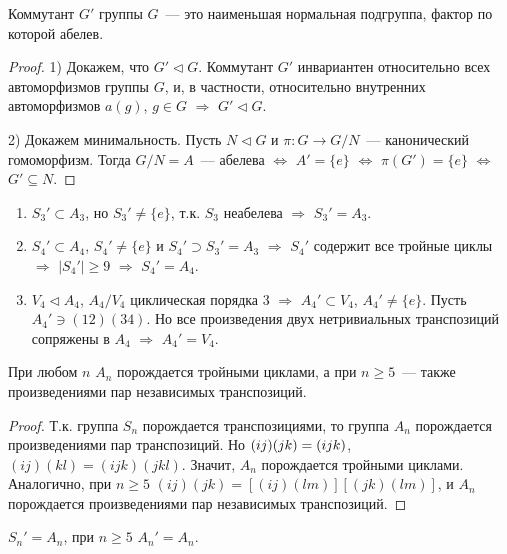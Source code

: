 \documentclass[a4paper]{article}
\newcommand*{\p}[1]{#1\nobreak\discretionary{}{\hbox{$\mathsurround=0pt #1$}}{}}
\begin{document}
\begin{theorem}
\label{1.IX}Коммутант $G'$ группы $G$~--- это наименьшая нормальная
подгруппа, фактор по которой абелев.
\end{theorem}

\begin{proof}
1) Докажем, что $G'\triangleleft G$. Коммутант $G'$ инвариантен
относительно всех автоморфизмов группы $G$, и, в частности,
относительно внутренних автоморфизмов $a(g)$, $g\in G$ $\Rightarrow$
$G'\triangleleft G$.

2) Докажем минимальность. Пусть $N\triangleleft G$ и $\pi\colon G\to
G/N$~--- канонический гомоморфизм. Тогда $G/N=A$~--- абелева
$\Leftrightarrow$ $A'=\{e\}$ $\Leftrightarrow$ $\pi(G')=\{e\}$
$\Leftrightarrow$ $G'\subseteq N$.
\end{proof}

\begin{ex}
\begin{enumerate}
  \item $S_3'\subset A_3$, но $S_3'\neq\{e\}$, т.к. $S_3$ неабелева
  $\Rightarrow$ $S_3'=A_3$.
  \item $S_4'\subset A_4$, $S_4'\neq\{e\}$ и $S_4'\supset S_3'=A_3$
  $\Rightarrow$ $S_4'$ содержит все тройные циклы $\Rightarrow$ $|S_4'|\geqslant
  9$ $\Rightarrow$ $S_4'=A_4$.
  \item $V_4\triangleleft A_4$, $A_4/V_4$ циклическая порядка 3
  $\Rightarrow$ $A_4'\subset V_4$, $A_4'\neq\{e\}$. Пусть $A_4'\ni
  (12)(34)$. Но все произведения двух нетривиальных транспозиций
  сопряжены в $A_4$ $\Rightarrow$ $A_4'=V_4$.
\end{enumerate}
\end{ex}

\begin{lemma}
При любом $n$ $A_n$ порождается тройными циклами, а при $n\geqslant
5$~--- также произведениями пар независимых транспозиций.
\end{lemma}

\begin{proof}
Т.к. группа $S_n$ порождается транспозициями, то группа $A_n$
порождается произведениями пар транспозиций. Но $(ij)(jk)\p=(ijk)$,
$(ij)(kl)=(ijk)(jkl)$. Значит, $A_n$ порождается тройными циклами.
Аналогично, при $n\geqslant 5$ $(ij)(jk)=[(ij)(lm)][(jk)(lm)]$, и
$A_n$ порождается произведениями пар независимых транспозиций.
\end{proof}

\begin{theorem}
$S_n'=A_n$, при $n\geqslant 5$ $A_n'=A_n$.
\end{theorem}
\end{document}
